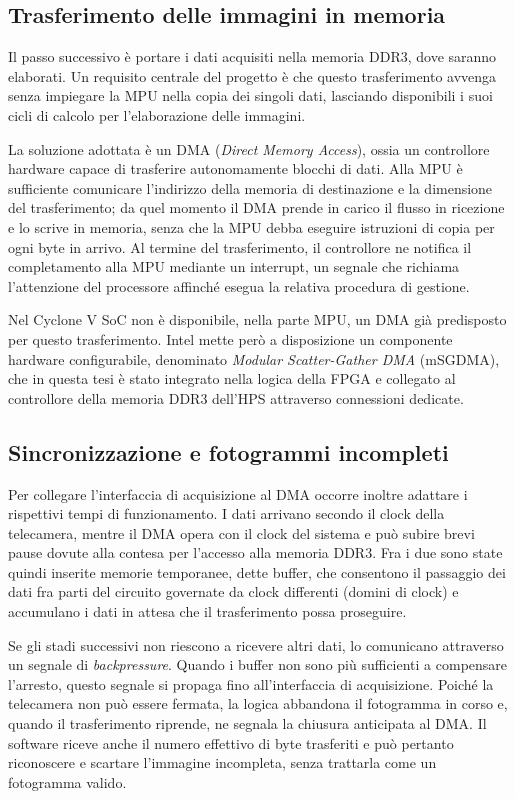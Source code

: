 \documentclass[a4paper,12pt]{article}
\begin{document}
\subsection{Trasferimento delle immagini in memoria}

Il passo successivo è portare i dati acquisiti nella memoria DDR3, dove saranno elaborati. Un requisito centrale del progetto è che questo trasferimento avvenga senza impiegare la MPU nella copia dei singoli dati, lasciando disponibili i suoi cicli di calcolo per l'elaborazione delle immagini.

La soluzione adottata è un DMA (\emph{Direct Memory Access}), ossia un controllore hardware capace di trasferire autonomamente blocchi di dati. Alla MPU è sufficiente comunicare l'indirizzo della memoria di destinazione e la dimensione del trasferimento; da quel momento il DMA prende in carico il flusso in ricezione e lo scrive in memoria, senza che la MPU debba eseguire istruzioni di copia per ogni byte in arrivo. Al termine del trasferimento, il controllore ne notifica il completamento alla MPU mediante un interrupt, un segnale che richiama l'attenzione del processore affinché esegua la relativa procedura di gestione.

Nel Cyclone V SoC non è disponibile, nella parte MPU, un DMA già predisposto per questo trasferimento. Intel mette però a disposizione un componente hardware configurabile, denominato \emph{Modular Scatter-Gather DMA} (mSGDMA), che in questa tesi è stato integrato nella logica della FPGA e collegato al controllore della memoria DDR3 dell'HPS attraverso connessioni dedicate.

\subsection{Sincronizzazione e fotogrammi incompleti}

Per collegare l'interfaccia di acquisizione al DMA occorre inoltre adattare i rispettivi tempi di funzionamento. I dati arrivano secondo il clock della telecamera, mentre il DMA opera con il clock del sistema e può subire brevi pause dovute alla contesa per l'accesso alla memoria DDR3. Fra i due sono state quindi inserite memorie temporanee, dette buffer, che consentono il passaggio dei dati fra parti del circuito governate da clock differenti (domini di clock) e accumulano i dati in attesa che il trasferimento possa proseguire.

Se gli stadi successivi non riescono a ricevere altri dati, lo comunicano attraverso un segnale di \emph{backpressure}. Quando i buffer non sono più sufficienti a compensare l'arresto, questo segnale si propaga fino all'interfaccia di acquisizione. Poiché la telecamera non può essere fermata, la logica abbandona il fotogramma in corso e, quando il trasferimento riprende, ne segnala la chiusura anticipata al DMA. Il software riceve anche il numero effettivo di byte trasferiti e può pertanto riconoscere e scartare l'immagine incompleta, senza trattarla come un fotogramma valido.
\end{document}
